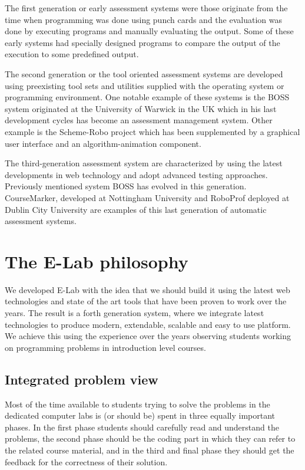 \documentclass{article}
\begin{document}
The first generation or early assessment systems were
those originate from the time when programming was done using punch cards and
the evaluation was done by executing programs and manually evaluating the
output. Some of these early systems had specially designed programs to
compare the output of the execution to some predefined output. 

The second generation or the tool oriented assessment systems are developed
using preexisting tool sets and utilities supplied with the operating system or
programming environment. One notable example of these systems is the BOSS
system originated at the University of Warwick in the UK \cite{joy2005boss} which in
his last development cycles has become an assessment management system. Other
example is the Scheme-Robo project \cite{saikkonen2001fully} which has been
supplemented by a graphical user interface and an algorithm-animation component.

The third-generation assessment system are characterized by using the latest
developments in web technology and adopt advanced testing approaches. Previously
mentioned system BOSS has evolved in this generation. CourseMarker, developed at
Nottingham University \cite{higgins2003coursemarker} and RoboProf deployed at
Dublin City University \cite{daly2004automated} are examples of this last
generation of automatic assessment systems.

\section{The E-Lab philosophy}

We developed E-Lab with the idea that we should build it using the latest web
technologies and state of the art tools that have been proven to work over the
years. The result is a forth generation system, where we integrate latest
technologies to produce modern, extendable, scalable and easy to use platform.
We achieve this using the experience over the years observing students working
on programming problems in introduction level courses. 

\subsection{Integrated problem view}

Most of the time available to students trying to solve the problems in the
dedicated computer labs is (or should be) spent in three equally important
phases. In the first phase students should carefully read and understand the problems,
the second phase should be the coding part in which they can refer to the
related course material, and in the third and final phase they should get the
feedback for the correctness of their solution.
\end{document}

